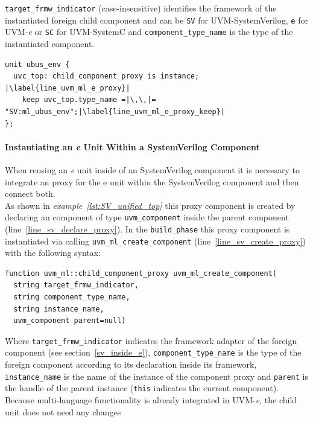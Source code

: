 \lstinline$target_frmw_indicator$ (case-insensitive) identifies the framework
of the instantiated foreign child component and can be \lstinline$SV$ for
UVM-SystemVerilog, \lstinline$e$ for UVM-\textit{e} or \lstinline$SC$ for UVM-SystemC and
\lstinline$component_type_name$ is the type of the instantiated component.
\medskip
\lstset{language=e, numbers=left, escapechar=|}
\begin{lstlisting}[frame=htrbl, caption={\textit{e}: instantiating the SystemVerilog component in the \textit{e} unit},
label={lst:e_unified_top}]
unit ubus_env {
  uvc_top: child_component_proxy is instance;	|\label{line_uvm_ml_e_proxy}|
    keep uvc_top.type_name =|\,\,|= "SV:ml_ubus_env";|\label{line_uvm_ml_e_proxy_keep}| 
};
\end{lstlisting}

\paragraph{Instantiating an \textit{e} Unit Within a SystemVerilog Component}
When reusing an \textit{e} unit inside of an SystemVerilog component it is
necessary to integrate an proxy for the e unit within the SystemVerilog
component and then connect both.\\
As shown in \emph{example~\ref{lst:SV_unified_top}} this proxy component is created by
declaring an component of type \lstinline$uvm_component$ inside the parent
component (line~\ref{line_sv_declare_proxy}). In the \lstinline$build_phase$ this proxy component is
instantiated via calling \lstinline$uvm_ml_create_component$ (line~\ref{line_sv_create_proxy}) with the following
syntax:
\medskip
{}
\begin{lstlisting}
function uvm_ml::child_component_proxy uvm_ml_create_component(
  string target_frmw_indicator,
  string component_type_name,
  string instance_name,
  uvm_component parent=null)
\end{lstlisting} 
\medskip
Where \lstinline$target_frmw_indicator$ indicates the framework adapter of the
foreign component (see section~\ref{sv_inside_e}),
\lstinline$component_type_name$ is the type of the foreign component according
to its declaration inside its framework, \lstinline$instance_name$ is the name
of the instance of the component proxy and \lstinline$parent$ is the handle of
the parent instance (\lstinline$this$ indicates the current component).\\
Because multi-language functionality is already integrated in UVM-\textit{e}, the child unit does not need any changes
